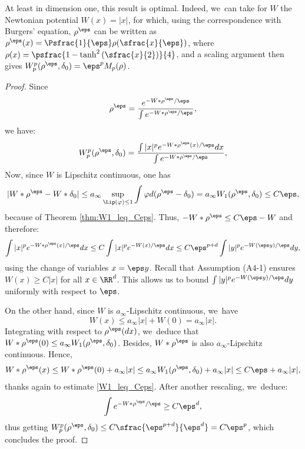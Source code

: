 \begin{remark}
At least in dimension one, this result is optimal. Indeed, we~can take for $W$ the Newtonian potential $W(x)=|x|$, for which, using the correspondence with Burgers' equation, $\rho^\eps$ can be written as $\rho^\eps(x) = \Psfrac{1}{\eps} \rho(\sfrac{x}{\eps})$, where $\rho(x) = \psfrac{1-\tanh^2\left(\sfrac{x}{2}\right)}{4}$, and a scaling argument then gives $W_p^p(\rho^\eps, \delta_0) = \eps^p M_p(\rho)$.
\end{remark}
\begin{proof}
Since
\[
\rho^\eps = \frac{e^{-W * \rho^\eps / \eps}}{\int e^{-W * \rho^\eps / \eps}},
\]
we have:
\[
W_p^p(\rho^\eps, \delta_0) = \frac{\int |x|^p e^{-W * \rho^\eps(x) / \eps} dx}{\int e^{-W * \rho^\eps / \eps}},
\]
Now, since $W$ is Lipschitz continuous, one has
\[
|W*\rho^\eps - W*\delta_0| \leq a_\infty \sup_{\Lip(\varphi) \leq 1} \int \varphi d(\rho^\eps - \delta_0) = a_\infty W_1(\rho^\eps, \delta_0) \leq C \eps,
\]
because of Theorem \ref{thm:W1_leq_Ceps}. Thus, $-W*\rho^\eps \leq C\eps - W$ and therefore:
\[
\int |x|^p e^{-W * \rho^\eps(x) / \eps} dx \leq C \int |x|^p e^{-W(x) / \eps}dx
\leq C\eps^{p+d} \int |y|^p e^{-W(\eps y) / \eps} dy,
\]
using the change of variables $x = \eps y$. Recall that Assumption (A4-1) ensures $W(x) \geq C|x|$ for all $x \in \RR^d$. This allows us to bound $\int |y|^p e^{-W(\eps y) / \eps} dy$ uniformly with respect to $\eps$.

On the other hand, since $W$ is $a_\infty$-Lipschitz continuous, we~have
\[
W(x) \leq a_\infty |x| + W(0) = a_\infty |x|.
\]
Integrating with respect to $\rho^\eps(dx)$, we~deduce that $W * \rho^\eps(0) \leq a_\infty W_1(\rho^\eps, \delta_0)$. Besides, $W * \rho^\eps$ is also $a_\infty$-Lipschitz continuous. Hence,
\[
W * \rho^\eps(x) \leq W * \rho^\eps(0) + a_\infty |x| \leq a_\infty W_1(\rho^\eps, \delta_0) + a_\infty |x| \leq C\eps + a_\infty |x|,
\]
thanks again to estimate \eqref{W1_leq_Ceps}. After another rescaling, we~deduce:
\[
\int e^{-W * \rho^\eps / \eps} \geq C \eps^d,
\]
thus getting $W_p^p(\rho^\eps, \delta_0) \leq C \sfrac{\eps^{p+d}}{\eps^d} = C\eps^p$, which concludes the proof.
\end{proof}


